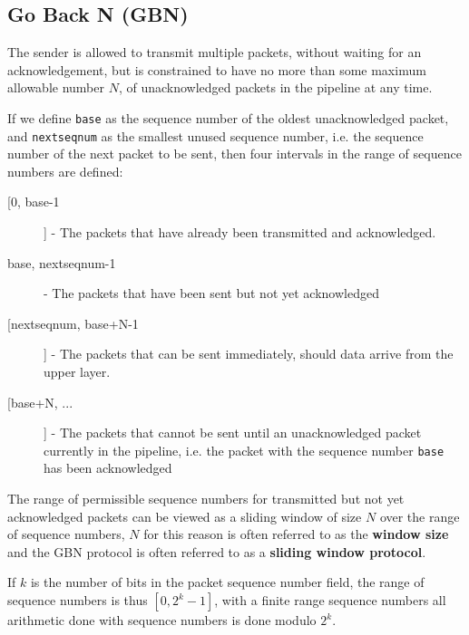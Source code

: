 \documentclass[12pt letter]{report}
\begin{document}
\subsection{Go Back N (GBN)}

The sender is allowed to transmit multiple packets, without waiting
for an acknowledgement, but is constrained to have no more than some
maximum allowable number $N$, of unacknowledged packets in the
pipeline at any time.

If we define \lstinline{base} as the sequence number of the oldest
unacknowledged packet, and \lstinline{nextseqnum} as the smallest
unused sequence number, i.e. the sequence number of the next packet
to be sent, then four intervals in the range of sequence numbers are defined:
\begin{description}
  \item[[0, base-1]] - The packets that have already been transmitted
    and acknowledged.
  \item[base, nextseqnum-1] - The packets that have been sent but not
    yet acknowledged
  \item[[nextseqnum, base+N-1]] - The packets that can be sent
    immediately, should data arrive from the upper layer.
  \item[[base+N, ...]] - The packets that cannot be sent until an
    unacknowledged packet currently in the pipeline, i.e. the packet
    with the sequence number \lstinline{base} has been acknowledged
\end{description}

The range of permissible sequence numbers for transmitted but not yet
acknowledged packets can be viewed as a sliding window of size $N$
over the range of sequence numbers, $N$ for this reason is often
referred to as the \textbf{window size} and the GBN protocol is often
referred to as a \textbf{sliding window protocol}.

If $k$ is the number of bits in the packet sequence number field, the
range of sequence numbers is thus $\left[ 0, 2^{k} - 1 \right] $,
with a finite range sequence numbers all arithmetic done with
sequence numbers is done modulo $2^k$.
\end{document}
